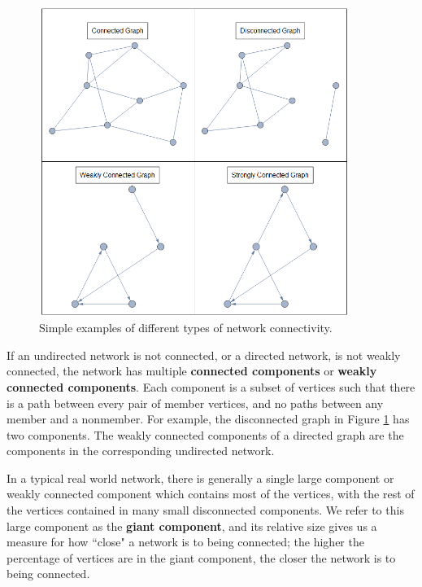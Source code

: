 \documentclass[12pt]{thesis}
\theoremstyle{plain}
\theoremstyle{definition}
\theoremstyle{remark}
\begin{document}
\begin{figure}[h]
\centering
\includegraphics[width=0.9\textwidth]{connectivity_demo.png}
\caption{Simple examples of different types of network connectivity.}
\label{fig:connectivity_demo}
\end{figure}

If an undirected network is not connected, or a directed network, is not weakly connected, the network has multiple \textbf{connected components} or \textbf{weakly connected components}. Each component is a subset of vertices such that there is a path between every pair of member vertices, and no paths between any member and a nonmember. For example, the disconnected graph in Figure \ref{fig:connectivity_demo} has two components. The weakly connected components of a directed graph are the components in the corresponding undirected network.

In a typical real world network, there is generally a single large component or weakly connected component which contains most of the vertices, with the rest of the vertices contained in many small disconnected components. We refer to this large component as the \textbf{giant component}, and its relative size gives us a measure for how ``close" a network is to being connected; the higher the percentage of vertices are in the giant component, the closer the network is to being connected.
\end{document}
